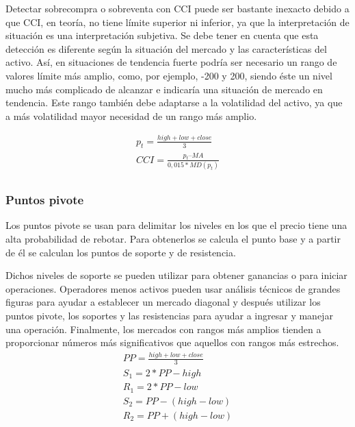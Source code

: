 Detectar sobrecompra o sobreventa con CCI puede ser bastante inexacto debido a que CCI, en teoría, no tiene límite superior ni inferior, ya que la interpretación de situación es una interpretación subjetiva. Se debe tener en cuenta que esta detección es diferente según la situación del mercado y las características del activo. Así, en situaciones de tendencia fuerte podría ser necesario un rango de valores límite más amplio, como, por ejemplo, -200 y 200, siendo éste un nivel mucho más complicado de alcanzar e indicaría una situación de mercado en tendencia. Este rango también debe adaptarse a la  volatilidad del activo, ya que a más volatilidad mayor necesidad de un rango más amplio.

\begin{gather*}
\label{eqn:CCI}
p_t = \frac{high + low + close}{3}\\
CCI = \frac{p_t – MA}{0,015 * MD(p_t)}\\
\end{gather*}


\pagebreak


\subsubsection*{Puntos pivote}
Los puntos pivote se usan para delimitar los niveles en los que el precio tiene una alta probabilidad de rebotar.
Para obtenerlos se calcula el punto base y a partir de él se calculan los puntos de soporte y de resistencia.

Dichos niveles de soporte se pueden utilizar para obtener ganancias o para iniciar operaciones. Operadores menos activos pueden usar análisis técnicos de grandes figuras para ayudar a establecer un mercado diagonal y después utilizar los puntos pivote, los soportes y las resistencias para ayudar a ingresar y manejar una operación. Finalmente, los mercados con rangos más amplios tienden a proporcionar números más significativos que aquellos con rangos más estrechos.
\begin{gather*}
\label{eqn:PP}
PP = \frac{high + low + close}{3} \\
S_1 = 2 * PP - high \\
R_1 = 2 * PP - low \\
S_2 = PP - (high - low) \\
R_2 = PP + (high -low) \\
\end{gather*}

